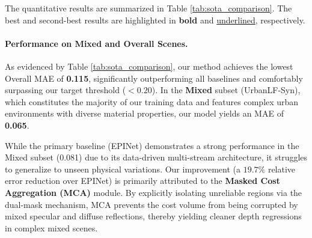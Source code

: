 The quantitative results are summarized in Table \ref{tab:sota_comparison}. The best and second-best results are highlighted in \textbf{bold} and \underline{underlined}, respectively.

\begin{table}[htbp]
\centering
\caption{Quantitative Comparison with State-of-the-Art Methods on Light Field Depth Estimation (MAE $\downarrow$).}
\label{tab:sota_comparison}
\end{table}

\paragraph{Performance on Mixed and Overall Scenes.}

As evidenced by Table \ref{tab:sota_comparison}, our method achieves the lowest Overall MAE of \textbf{0.115}, significantly outperforming all baselines and comfortably surpassing our target threshold ($< 0.20$). In the \textbf{Mixed} subset (UrbanLF-Syn), which constitutes the majority of our training data and features complex urban environments with diverse material properties, our model yields an MAE of \textbf{0.065}. 

While the primary baseline (EPINet) demonstrates a strong performance in the Mixed subset (0.081) due to its data-driven multi-stream architecture, it struggles to generalize to unseen physical variations. Our improvement (a $19.7\%$ relative error reduction over EPINet) is primarily attributed to the \textbf{Masked Cost Aggregation (MCA)} module. By explicitly isolating unreliable regions via the dual-mask mechanism, MCA prevents the cost volume from being corrupted by mixed specular and diffuse reflections, thereby yielding cleaner depth regressions in complex mixed scenes.

